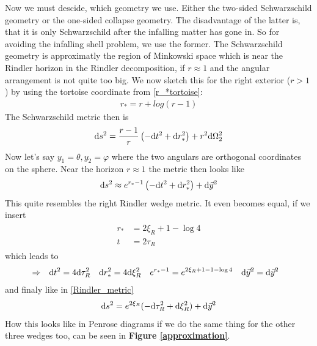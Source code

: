 Now we must descide, which geometry we use. Either the two-sided Schwarzschild geometry or the one-sided collapse geometry. The disadvantage of the latter is, that it is only Schwarzschild after the infalling matter has gone in. So for avoiding the infalling shell problem, we use the former. 
The Schwarzschild geometry is approximatly the region of Minkowski space which is near the Rindler horizon in the Rindler decomposition, if $r \approx 1$ and the angular arrangement is not quite too big. We now sketch this for the right exterior ($r>1$) by using the tortoise coordinate from \eqref{r_*tortoise}:
	\begin{align*}
		r_*=r + log(r-1)
	\end{align*}
The Schwarzschild metric then is
	\begin{align}
		\mathrm{d} s^2=\frac{r-1}{r}\left(-\mathrm{d} t^2 + \mathrm{d} r^2_*\right) + r^2 \mathrm{d} \Omega^2_2
	\end{align}
Now let's say $y_1=\theta, y_2=\varphi$ where the two angulars are orthogonal coordinates on the sphere. Near the horizon $r\approx1$ the metric then looks like 
	\begin{align}
		\mathrm{d} s^2 \approx e^{r_* - 1} \left(-\mathrm{d} t^2 + \mathrm{d} r^2_*\right) + \mathrm{d} \vec{y}^2
	\end{align}
This quite resembles the right Rindler wedge metric. It even becomes equal, if we insert
	\begin{align}
		\begin{split}
			r_*&= 2\xi_R + 1 - \log 4 \\
			t &= 2\tau_R
		\end{split}
	\end{align}
which leads to
	\begin{align*}
		&\Rightarrow &
		\mathrm{d} t^2 &= 4 \mathrm{d} \tau_R^2 & \mathrm{d} r_*^2 &= 4 \mathrm{d} \xi_R^2 &e^{r_* -1} &= e^{2\xi_R + 1 - 1 - \log 4} & \mathrm{d} \vec{y}^2 &= \mathrm{d} \vec{y}^2
	\end{align*}
and finaly like in \eqref{Rindler_metric}
	\begin{align*}
		\mathrm{d} s^2 = e^{2\xi_R} (-\mathrm{d} \tau_R^2 + \mathrm{d} \xi_R^2) + \mathrm{d} \vec{y}^2 
	\end{align*}
How this looks like in Penrose diagrams if we do the same thing for the other three wedges too, can be seen in \textbf{Figure \ref{approximation}}.
